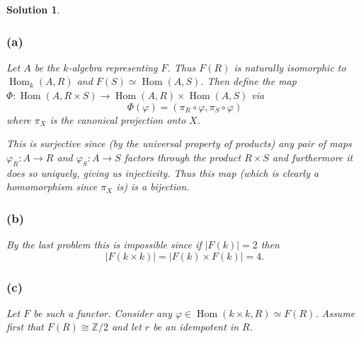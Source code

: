 \documentclass[12pt]{article}
\theoremstyle{nonumberbreak}
\newtheorem{sol}{Solution}
\theoremstyle{changebreak}
\theoremstyle{nonumberplain}
\theoremstyle{change}
\newcommand*{\bbZ}{\mathbb{Z}}
\DeclareMathOperator{\Hom}{Hom}
\begin{document}
\begin{sol}
	\subsubsection*{(a)}
	Let $A$ be the $k$-algebra representing $F$. Thus $F(R)$ is naturally isomorphic to
	$\Hom_k(A,R)$ and $F(S)\simeq\Hom(A,S)$. Then define the map $\Phi:\Hom(A,R\times S)\to\Hom(A,R)\times\Hom(A,S)$
	via
	\[\Phi(\varphi)=(\pi_R\circ\varphi,\pi_S\circ\varphi)\]
	where $\pi_X$ is the canonical projection onto $X$.

	This is surjective since (by the universal property of products) any pair of maps
	$\varphi_R:A\to R$ and $\varphi_S:A\to S$ factors through the product $R\times S$
	and furthermore it does so \textit{uniquely}, giving us injectivity. Thus this map
	(which is clearly a homomorphism since $\pi_X$ is) is a bijection.
	\subsubsection*{(b)}
	By the last problem this is impossible since if $|F(k)|=2$ then 
	\[|F(k\times k)|=|F(k)\times F(k)|=4.\]
	\subsubsection*{(c)}
	Let $F$ be such a functor. Consider any $\varphi\in\Hom(k\times k, R)\simeq F(R)$.
	Assume first that $F(R)\cong \bbZ/2$ and let $r$ be an idempotent in $R$. 
\end{sol}
\end{document}
